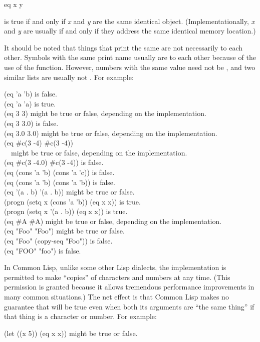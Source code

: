 \begin{defun}[Function]
eq x y

 is true
if and only if \emph{x} and \emph{y} are the same identical object.
(Implementationally, \emph{x} and \emph{y} are usually
 if and only if they address the same identical memory location.)

It should be noted that things that print the same are not necessarily 
to each other.  Symbols with the same print name usually are  to
each other because of the use of the  function.
However, numbers with the same value
need not be , and two similar lists are usually not .
For example:
\begin{lisp}
(eq 'a 'b) {\rm is false.} \\
(eq 'a 'a) {\rm is true.} \\
(eq 3 3) {\rm might be true or false, depending on the implementation.} \\
(eq 3 3.0) {\rm is false.} \\
(eq 3.0 3.0) {\rm might be true or false, depending on the implementation.} \\
(eq \#c(3 -4) \#c(3 -4)) \\
~~{\rm might be true or false, depending on the implementation.} \\
(eq \#c(3 -4.0) \#c(3 -4)) {\rm is false.} \\
(eq (cons 'a 'b) (cons 'a 'c)) {\rm is false.} \\
(eq (cons 'a 'b) (cons 'a 'b)) {\rm is false.} \\
(eq '(a . b) '(a . b)) {\rm might be true or false.} \\
(progn (setq x (cons 'a 'b)) (eq x x)) {\rm is true.} \\
(progn (setq x '(a . b)) (eq x x)) {\rm is true.} \\
(eq \#{\Xbackslash}A \#{\Xbackslash}A) {\rm might be true or false, depending on the implementation.} \\
(eq "Foo" "Foo") {\rm might be true or false.} \\
(eq "Foo" (copy-seq "Foo")) {\rm is false.} \\
(eq "FOO" "foo") {\rm is false.}
\end{lisp}

In Common Lisp, unlike some other Lisp dialects, the implementation
is permitted to make ``copies'' of
characters and numbers at any time.  (This permission is granted
because it allows tremendous performance improvements in many
common situations.)  The net effect is that
Common Lisp makes no guarantee that  will be true even when both
its arguments are ``the same thing'' if that thing is a character or number.
For example:
\begin{lisp}
(let ((x 5)) (eq x x)) \textrm{might be true or false.}
\end{lisp}


\end{defun}
